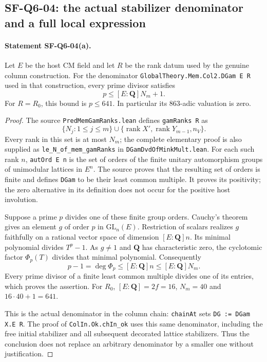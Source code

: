 \subsection{SF-Q6-04: the actual stabilizer denominator and a full local expression}

\paragraph{Statement SF-Q6-04(a).}
Let $E$ be the host CM field and let $R$ be the rank datum used by
the genuine column construction.  For the denominator
\texttt{GlobalTheory.Mem.Col2.DGam E R} used in that construction,
every prime divisor satisfies
\[
 p\le [E:\mathbf Q]N_m+1.
\]
For $R=R_0$, this bound is $p\le641$.  In particular its
$863$-adic valuation is zero.

\begin{proof}
The source \texttt{PredMemGamRanks.lean} defines
\texttt{gamRanks R} as
\[
 \{N_j:1\le j\le m\}\cup
 \{\operatorname{rank}X',\operatorname{rank}Y_{m-1},n_V\}.
\]
Every rank in this set is at most $N_m$; the complete elementary
proof is also supplied as \texttt{le\_N\_of\_mem\_gamRanks} in
\texttt{DGamDvdOfMinkMult.lean}.
For each such rank $n$, \texttt{autOrd E n} is the set of orders
of the finite unitary automorphism groups of unimodular lattices
in $E^n$.  The source proves that the resulting set of orders is
finite and defines \texttt{DGam} to be their least common multiple.
It proves its positivity; the zero alternative in its definition
does not occur for the positive host involution.

Suppose a prime $p$ divides one of these finite group orders.
Cauchy's theorem gives an element $g$ of order $p$ in
$\mathrm{GL}_n(E)$.  Restriction of scalars realizes $g$ faithfully
on a rational vector space of dimension $[E:\mathbf Q]n$.
Its minimal polynomial divides $T^p-1$.  As $g\ne1$ and
$\mathbf Q$ has characteristic zero, the cyclotomic factor
$\Phi_p(T)$ divides that minimal polynomial.  Consequently
\[
 p-1=\deg\Phi_p\le [E:\mathbf Q]n\le[E:\mathbf Q]N_m.
\]
Every prime divisor of a finite least common multiple divides
one of its entries, which proves the assertion.  For $R_0$,
$[E:\mathbf Q]=2f=16$, $N_m=40$ and $16\cdot40+1=641$.

This is the actual denominator in the column chain:
\texttt{chainAt} sets \texttt{DG := DGam X.E R}.
The proof of \texttt{ColIn.Ok.chIn\_ok} uses this same denominator,
including the free initial stabilizer and all subsequent decorated
lattice stabilizers.  Thus the conclusion does not replace an
arbitrary denominator by a smaller one without justification.
\end{proof}

